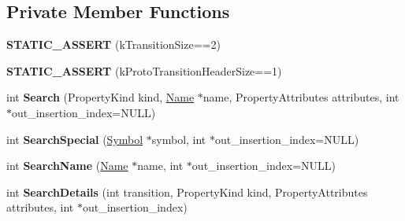 \subsection*{Private Member Functions}
\begin{DoxyCompactItemize}
\item 
{\bfseries S\+T\+A\+T\+I\+C\+\_\+\+A\+S\+S\+E\+RT} (k\+Transition\+Size==2)\hypertarget{classv8_1_1internal_1_1_transition_array_aec92346a8c670d35ce1cdeac9f1a5c95}{}\label{classv8_1_1internal_1_1_transition_array_aec92346a8c670d35ce1cdeac9f1a5c95}

\item 
{\bfseries S\+T\+A\+T\+I\+C\+\_\+\+A\+S\+S\+E\+RT} (k\+Proto\+Transition\+Header\+Size==1)\hypertarget{classv8_1_1internal_1_1_transition_array_a0f218ca6413b0330cd736dadee1496a3}{}\label{classv8_1_1internal_1_1_transition_array_a0f218ca6413b0330cd736dadee1496a3}

\item 
int {\bfseries Search} (Property\+Kind kind, \hyperlink{classv8_1_1internal_1_1_name}{Name} $\ast$name, Property\+Attributes attributes, int $\ast$out\+\_\+insertion\+\_\+index=N\+U\+LL)\hypertarget{classv8_1_1internal_1_1_transition_array_a6232aa44cfd94ae3e0e4dbc86a0ccd85}{}\label{classv8_1_1internal_1_1_transition_array_a6232aa44cfd94ae3e0e4dbc86a0ccd85}

\item 
int {\bfseries Search\+Special} (\hyperlink{classv8_1_1internal_1_1_symbol}{Symbol} $\ast$symbol, int $\ast$out\+\_\+insertion\+\_\+index=N\+U\+LL)\hypertarget{classv8_1_1internal_1_1_transition_array_a719276854ce2660de23ea1ff08f8c478}{}\label{classv8_1_1internal_1_1_transition_array_a719276854ce2660de23ea1ff08f8c478}

\item 
int {\bfseries Search\+Name} (\hyperlink{classv8_1_1internal_1_1_name}{Name} $\ast$name, int $\ast$out\+\_\+insertion\+\_\+index=N\+U\+LL)\hypertarget{classv8_1_1internal_1_1_transition_array_a677d37b0f802cc7b63c951279aaae880}{}\label{classv8_1_1internal_1_1_transition_array_a677d37b0f802cc7b63c951279aaae880}

\item 
int {\bfseries Search\+Details} (int transition, Property\+Kind kind, Property\+Attributes attributes, int $\ast$out\+\_\+insertion\+\_\+index)\hypertarget{classv8_1_1internal_1_1_transition_array_a006130993f55c3cdd97a724a241fc992}{}\label{classv8_1_1internal_1_1_transition_array_a006130993f55c3cdd97a724a241fc992}


\end{DoxyCompactItemize}
